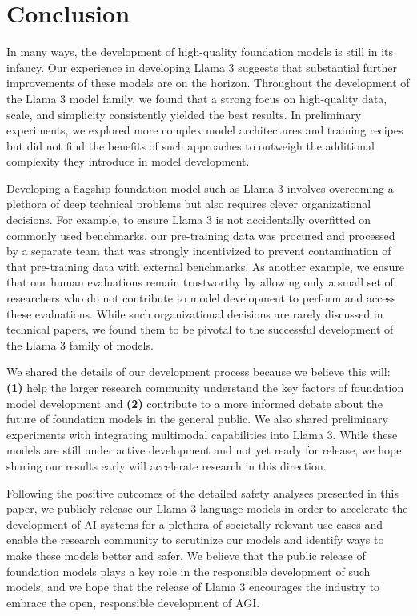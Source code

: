 \documentclass[dvipsnames]{fairmeta}
\begin{document}
\section{Conclusion}
\label{section:conclusion}
In many ways, the development of high-quality foundation models is still in its infancy.
Our experience in developing Llama 3 suggests that substantial further improvements of these models are on the horizon.
Throughout the development of the Llama 3 model family, we found that a strong focus on high-quality data, scale, and simplicity consistently yielded the best results.
In preliminary experiments, we explored more complex model architectures and training recipes but did not find the benefits of such approaches to outweigh the additional complexity they introduce in model development.

Developing a flagship foundation model such as Llama 3 involves overcoming a plethora of deep technical problems but also requires clever organizational decisions.
For example, to ensure Llama 3 is not accidentally overfitted on commonly used benchmarks, our pre-training data was procured and processed by a separate team that was strongly incentivized to prevent contamination of that pre-training data with external benchmarks. 
As another example, we ensure that our human evaluations remain trustworthy by allowing only a small set of researchers who do not contribute to model development to perform and access these evaluations.
While such organizational decisions are rarely discussed in technical papers, we found them to be pivotal to the successful development of the Llama 3 family of models.

We shared the details of our development process because we believe this will: \textbf{(1)} help the larger research community understand the key factors of foundation model development and \textbf{(2)} contribute to a more informed debate about the future of foundation models in the general public.
We also shared preliminary experiments with integrating multimodal capabilities into Llama 3.
While these models are still under active development and not yet ready for release, we hope sharing our results early will accelerate research in this direction.

Following the positive outcomes of the detailed safety analyses presented in this paper, we publicly release our Llama 3 language models in order to accelerate the development of AI systems for a plethora of societally relevant use cases and enable the research community to scrutinize our models and identify ways to make these models better and safer.
We believe that the public release of foundation models plays a key role in the responsible development of such models, and we hope that the release of Llama 3 encourages the industry to embrace the open, responsible development of AGI.
\end{document}
